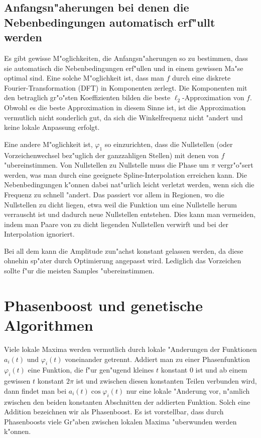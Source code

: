 \documentclass[a4paper]{scrartcl}
\newcommand{\pphi}{{\varphi}}
\begin{document}
\subsection{Anfangsn"aherungen bei denen die Nebenbedingungen automatisch erf"ullt werden}

Es gibt gewisse M"oglichkeiten, die Anfangsn"aherungen so zu bestimmen, dass sie automatisch die Nebenbedingungen erf"ullen und in einem gewissen Ma"se optimal sind. Eine solche M"oglichkeit ist, dass man $f$ durch eine diskrete Fourier-Transformation (DFT) in Komponenten zerlegt. Die Komponenten mit den betraglich gr"o"sten Koeffizienten bilden die beste $\ell_2$-Approximation von $f$. Obwohl es die beste Approximation in diesem Sinne ist, ist die Approximation vermutlich nicht sonderlich gut, da sich die Winkelfrequenz nicht "andert und keine lokale Anpassung erfolgt. 

Eine andere M"oglichkeit ist, $\pphi_1$ so einzurichten, dass die Nullstellen (oder Vorzeichenwechsel bez"uglich der ganzzahligen Stellen) mit denen von $f$ "ubereinstimmen. Von Nullstellen zu Nullstelle muss die Phase um $\pi$ vergr"o"sert werden, was man durch eine geeignete Spline-Interpolation erreichen kann. Die Nebenbedingungen k"onnen dabei nat"urlich leicht verletzt werden, wenn sich die Frequenz zu schnell "andert. Das passiert vor allem in Regionen, wo die Nullstellen zu dicht liegen, etwa weil die Funktion um eine Nullstelle herum verrauscht ist und dadurch neue Nullstellen entstehen. Dies kann man vermeiden, indem man Paare von zu dicht liegenden Nullstellen verwirft und bei der Interpolation ignoriert. 

Bei all dem kann die Amplitude zun"achst konstant gelassen werden, da diese ohnehin sp"ater durch Optimierung angepasst wird. Lediglich das Vorzeichen sollte f"ur die meisten Samples "ubereinstimmen. 



\section{Phasenboost und genetische Algorithmen} \label{sec:jumps}

Viele lokale Maxima werden vermutlich durch lokale "Anderungen der Funktionen $a_i(t)$ und $\pphi_i(t)$ voneinander getrennt. Addiert man zu einer Phasenfunktion $\pphi_i(t)$ eine Funktion, die f"ur gen"ugend kleines $t$ konstant $0$ ist und ab einem gewissen $t$ konstant $2\pi$ ist und zwischen diesen konstanten Teilen verbunden wird, dann findet man bei $a_i(t)\cos\pphi_i(t)$ nur eine lokale "Anderung vor, n"amlich zwischen den beiden konstanten Abschnitten der addierten Funktion. Solch eine Addition bezeichnen wir als Phasenboost. Es ist vorstellbar, dass durch Phasenboosts viele Gr"aben zwischen lokalen Maxima "uberwunden werden k"onnen. 
\end{document}
